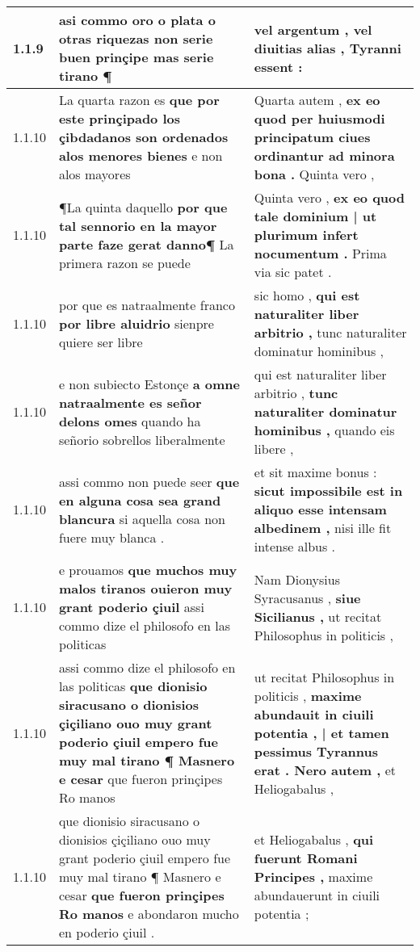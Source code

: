 \begin{tabular}{|p{1cm}|p{6.5cm}|p{6.5cm}|}
1.1.9 & asi commo oro o plata o otras riquezas \textbf{ non serie buen prinçipe } mas serie tirano ¶ & vel argentum , \textbf{ vel diuitias alias , } Tyranni essent : \\\hline
1.1.10 & La quarta razon es \textbf{ que por este prinçipado los çibdadanos son ordenados alos menores bienes } e non alos mayores & Quarta autem , \textbf{ ex eo quod per huiusmodi principatum ciues ordinantur ad minora bona . } Quinta vero , \\\hline
1.1.10 & ¶La quinta daquello \textbf{ por que tal sennorio en la mayor parte faze gerat danno¶ } La primera razon se puede & Quinta vero , \textbf{ ex eo quod tale dominium | ut plurimum infert nocumentum . } Prima via sic patet . \\\hline
1.1.10 & por que es natraalmente franco \textbf{ por libre aluidrio } sienpre quiere ser libre & sic homo , \textbf{ qui est naturaliter liber arbitrio , } tunc naturaliter dominatur hominibus , \\\hline
1.1.10 & e non subiecto Estonçe \textbf{ a omne natraalmente es señor delons omes } quando ha señorio sobrellos liberalmente & qui est naturaliter liber arbitrio , \textbf{ tunc naturaliter dominatur hominibus , } quando eis libere , \\\hline
1.1.10 & assi commo non puede seer \textbf{ que en alguna cosa sea grand blancura } si aquella cosa non fuere muy blanca . & et sit maxime bonus : \textbf{ sicut impossibile est in aliquo esse intensam albedinem , } nisi ille fit intense albus . \\\hline
1.1.10 & e prouamos \textbf{ que muchos muy malos tiranos ouieron muy grant poderio çiuil } assi commo dize el philosofo en las politicas & Nam Dionysius Syracusanus , \textbf{ siue Sicilianus , } ut recitat Philosophus in politicis , \\\hline
1.1.10 & assi commo dize el philosofo en las politicas \textbf{ que dionisio siracusano o dionisios çiçiliano ouo muy grant poderio çiuil empero fue muy mal tirano ¶ Masnero e cesar } que fueron prinçipes Ro manos & ut recitat Philosophus in politicis , \textbf{ maxime abundauit in ciuili potentia , | et tamen pessimus Tyrannus erat . Nero autem , } et Heliogabalus , \\\hline
1.1.10 & que dionisio siracusano o dionisios çiçiliano ouo muy grant poderio çiuil empero fue muy mal tirano ¶ Masnero e cesar \textbf{ que fueron prinçipes Ro manos } e abondaron mucho en poderio çiuil . & et Heliogabalus , \textbf{ qui fuerunt Romani Principes , } maxime abundauerunt in ciuili potentia ; \\\hline

\end{tabular}
